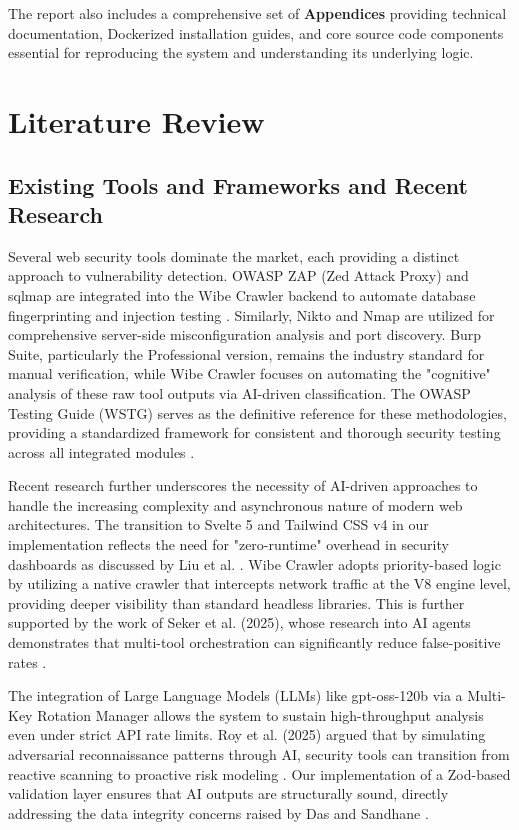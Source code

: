\documentclass[12pt,oneside,a4paper]{book}
\begin{document}
The report also includes a comprehensive set of \textbf{Appendices} providing technical documentation, Dockerized installation guides, and core source code components essential for reproducing the system and understanding its underlying logic.
\chapter{Literature Review}
\label{chap:litreview}

\section{Existing Tools and Frameworks and Recent Research}

Several web security tools dominate the market, each providing a distinct approach to vulnerability detection. OWASP ZAP (Zed Attack Proxy) and sqlmap are integrated into the Wibe Crawler backend to automate database fingerprinting and injection testing \cite{zaproxy2024}. Similarly, Nikto and Nmap are utilized for comprehensive server-side misconfiguration analysis and port discovery. Burp Suite, particularly the Professional version, remains the industry standard for manual verification, while Wibe Crawler focuses on automating the "cognitive" analysis of these raw tool outputs via AI-driven classification. The OWASP Testing Guide (WSTG) serves as the definitive reference for these methodologies, providing a standardized framework for consistent and thorough security testing across all integrated modules \cite{owasp2024}.

Recent research further underscores the necessity of AI-driven approaches to handle the increasing complexity and asynchronous nature of modern web architectures. The transition to Svelte 5 and Tailwind CSS v4 in our implementation reflects the need for "zero-runtime" overhead in security dashboards as discussed by Liu et al. \cite{liu2025}. Wibe Crawler adopts priority-based logic by utilizing a native crawler that intercepts network traffic at the V8 engine level, providing deeper visibility than standard headless libraries. This is further supported by the work of Seker et al. (2025), whose research into AI agents demonstrates that multi-tool orchestration can significantly reduce false-positive rates \cite{seker2025}. 

The integration of Large Language Models (LLMs) like gpt-oss-120b via a Multi-Key Rotation Manager allows the system to sustain high-throughput analysis even under strict API rate limits. Roy et al. (2025) argued that by simulating adversarial reconnaissance patterns through AI, security tools can transition from reactive scanning to proactive risk modeling \cite{roy2025}. Our implementation of a Zod-based validation layer ensures that AI outputs are structurally sound, directly addressing the data integrity concerns raised by Das and Sandhane \cite{das2021}.
\end{document}
